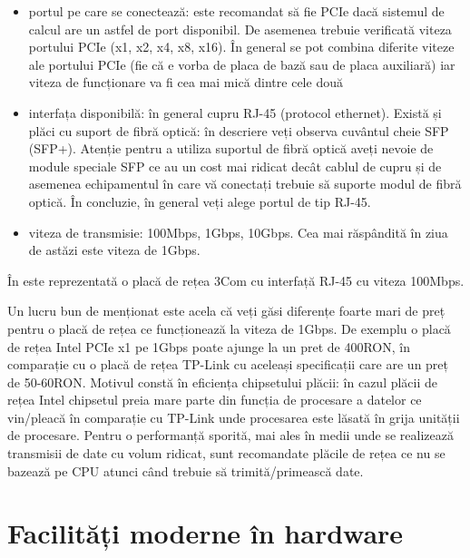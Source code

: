 \begin{itemize}
  \item portul pe care se conectează: este recomandat să fie PCIe dacă
          sistemul de calcul are un astfel de port disponibil. De asemenea
          trebuie verificată viteza portului PCIe (x1, x2, x4, x8, x16).
          În general se pot combina diferite viteze ale portului PCIe (fie
          că e vorba de placa de bază sau de placa auxiliară) iar viteza
          de funcționare va fi cea mai mică dintre cele două
  \item interfața disponibilă: în general cupru RJ-45 (protocol ethernet).
          Există și plăci cu suport de fibră optică: în descriere veți
          observa cuvântul cheie SFP  (SFP+). Atenție pentru a utiliza suportul
          de fibră optică aveți nevoie de module speciale SFP ce au un
          cost mai ridicat decât cablul de cupru și de asemenea
          echipamentul în care vă conectați trebuie să suporte modul de
          fibră optică. În concluzie, în general veți alege portul de tip
          RJ-45.
  \item viteza de transmisie: 100Mbps, 1Gbps, 10Gbps. Cea mai răspândită
          în ziua de astăzi este viteza de 1Gbps.
\end{itemize}

În  este reprezentată o placă de rețea 3Com cu interfață RJ-45 cu viteza 100Mbps.

Un lucru bun de menționat este acela că veți găsi diferențe foarte mari de preț
pentru o placă de rețea ce funcționează la viteza de 1Gbps. De exemplu o placă
de rețea Intel PCIe x1 pe 1Gbps poate ajunge la un pret de 400RON, în comparație
cu o placă de rețea TP-Link cu aceleași specificații care are un preț de
50-60RON. Motivul constă în eficiența chipsetului plăcii: în cazul plăcii de
rețea Intel chipsetul preia mare parte din funcția de procesare a datelor ce
vin/pleacă în comparație cu TP-Link unde procesarea este lăsată în grija
unității de procesare. Pentru o performanță sporită, mai ales în medii unde se
realizează transmisii de date cu volum ridicat, sunt recomandate plăcile de
rețea ce nu se bazează pe CPU atunci când trebuie să trimită/primească date.

\section{Facilități moderne în hardware}
\label{sec:hw:features}

